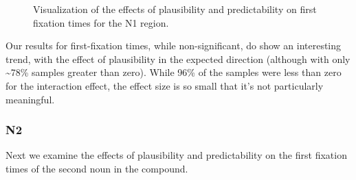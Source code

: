 \documentclass[
  letterpaper,
  DIV=11,
  numbers=noendperiod,
  nottoc]{scrreprt}
\begin{document}
\begin{figure}[htbp]


\caption{\label{fig-firstfixn1}Visualization of the effects of
plausibility and predictability on first fixation times for the N1
region.}

\end{figure}%

Our results for first-fixation times, while non-significant, do show an
interesting trend, with the effect of plausibility in the expected
direction (although with only \textasciitilde78\% samples greater than
zero). While 96\% of the samples were less than zero for the interaction
effect, the effect size is so small that it's not particularly
meaningful.

\subsubsection{N2}\label{n2}

Next we examine the effects of plausibility and predictability on the
first fixation times of the second noun in the compound.
\end{document}
